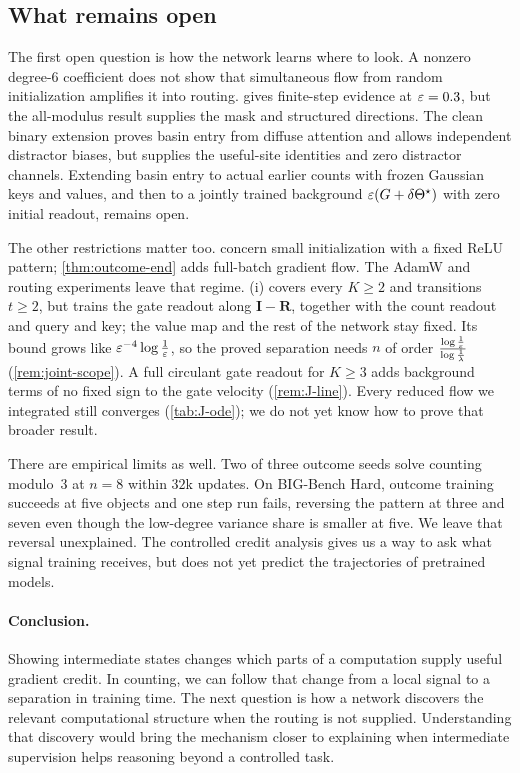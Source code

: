 \subsection{What remains open}
The first open question is how the network learns where to look. A nonzero degree-$6$ coefficient does not show that simultaneous
flow from random initialization amplifies it into routing.  gives finite-step evidence at $\varepsilon=0.3$, but the
all-modulus result supplies the mask and structured directions. The clean binary extension proves basin entry from diffuse
attention and allows independent distractor biases, but supplies the useful-site identities and zero distractor channels.
Extending basin entry to actual earlier counts with frozen Gaussian keys and values, and then to a jointly trained background
$\varepsilon(G+\delta\Theta^\star)$ with zero initial readout, remains open.

The other restrictions matter too.  concern small initialization with a fixed ReLU pattern;
\cref{thm:outcome-end} adds full-batch gradient flow. The AdamW and routing experiments leave that regime. (i) covers
every $K\ge2$ and transitions $t\ge2$, but trains the gate readout along $\mathbf I-\mathbf R$, together with the count readout and
query and key; the value map and the rest of the network stay fixed. Its bound grows like $\varepsilon^{-4}\log\frac{1}{\varepsilon}$,
so the proved separation needs $n$ of order $\frac{\log\frac{1}{\varepsilon}}{\log\frac{1}{\lambda}}$ (\cref{rem:joint-scope}). A full
circulant gate readout for $K\ge3$ adds background terms of no fixed sign to the gate velocity (\cref{rem:J-line}). Every reduced
flow we integrated still converges (\cref{tab:J-ode}); we do not yet know how to prove that broader result.

There are empirical limits as well. Two of three outcome seeds solve counting modulo~$3$ at $n=8$ within $32$k updates.
On BIG-Bench Hard, outcome training succeeds at five objects and one step run fails, reversing the pattern at three and seven
even though the low-degree variance share is smaller at five. We leave that reversal unexplained. The controlled credit analysis
gives us a way to ask what signal training receives, but does not yet predict the trajectories of pretrained models.

\paragraph{Conclusion.} Showing intermediate states changes which parts of a computation supply useful gradient credit. In counting,
we can follow that change from a local signal to a separation in training time. The next question is how a network discovers the
relevant computational structure when the routing is not supplied. Understanding that discovery would bring the mechanism closer
to explaining when intermediate supervision helps reasoning beyond a controlled task.
